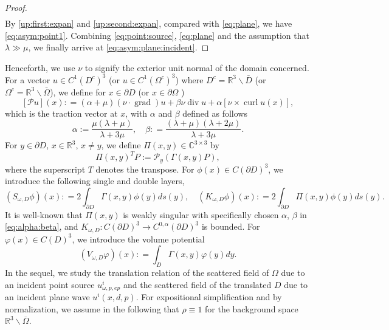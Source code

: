 \documentclass[a4paper,11pt]{article}
\theoremstyle{remark}
\theoremstyle{definition}
\numberwithin{equation}{section}
\DeclareMathOperator{\curl}{curl}
\DeclareMathOperator{\Div}{div}
\DeclareMathOperator{\grad}{grad}
\begin{document}
\begin{proof}
\begin{equation}
\begin{aligned}
\end{aligned}
\end{equation}
By \eqref{up:first:expan} and \eqref{up:second:expan}, compared with \eqref{eq:plane}, we have \eqref{eq:asym:point1}.
Combining \eqref{eq:point:source}, \eqref{eq:plane} and the assumption that $\lambda \gg \mu$, we finally arrive at \eqref{eq:asym:plane:incident}.
\end{proof}
%
Henceforth, we use $\nu$ to signify the exterior unit normal of the domain concerned.  For a vector $u \in C^{1}(D^c)^3$ (or $u \in C^{1}(\Omega^c)^3$) where $D^c = \mathbb{R}^3 \backslash \bar D$ (or $\Omega^c = \mathbb{R}^3 \backslash \bar \Omega$), we define for $x \in \partial D$ (or $x \in \partial \Omega$ )
 \begin{equation}\label{eq:traction:elastic}
 [\mathcal{P}u](x): = (\alpha + \mu)(\nu\cdot \grad)u + \beta \nu \Div u + \alpha [\nu  \times \curl u(x)],
 \end{equation}
which is the traction vector at $x$, with $\alpha$ and $\beta$ defined as follows
\begin{equation}\label{eq:alpha:beta}
\alpha :=\frac{\mu(\lambda + \mu)}{\lambda+3\mu}, \quad \beta: = \frac{(\lambda+\mu)(\lambda+2\mu)}{\lambda+3 \mu}.
\end{equation}
For $y \in \partial D$, $x\in \mathbb{R}^3$, $x \neq y$, we define $\Pi(x,y) \in \mathbb{C}^{3\times3}$ by
\[
\Pi(x,y)^{T}P := \mathcal{P}_{y}(\Gamma(x,y)P),
\]
where the superscript $T$ denotes the transpose.
For $\phi(x) \in C(\partial D)^3$, we introduce the following single and double layers,
\[
(S_{\omega, D} \phi)(x) : = 2 \int_{\partial D} \Gamma(x,y) \phi(y)ds(y), \quad (K_{\omega, D}\phi)(x): = 2 \int_{\partial D} \Pi(x,y) \phi(y)ds(y).
\]
It is well-known \cite{PH} that  $\Pi(x,y)$ is weakly singular with specifically chosen $\alpha$, $\beta$ in \eqref{eq:alpha:beta}, and $K_{\omega, D}: C(\partial D)^3 \rightarrow C^{0, \alpha}(\partial D)^3$ is bounded.
For $\varphi(x) \in C(D)^3$, we introduce the volume potential
\[
(V_{\omega, D}\varphi)(x): = \int_{D}\Gamma(x,y)\varphi(y)dy.
\]
 In the sequel, we study the translation relation of the scattered field of $\Omega$ due to an incident point source $u_{\omega,p,ep}^i$ and the scattered field of the translated $D$ due to an incident plane wave $u^i(x,d,p)$. For expositional simplification and by normalization, we assume in the following that $\rho\equiv 1$ for the background space $\mathbb{R}^3\backslash \overline{\Omega}$.
\end{document}
